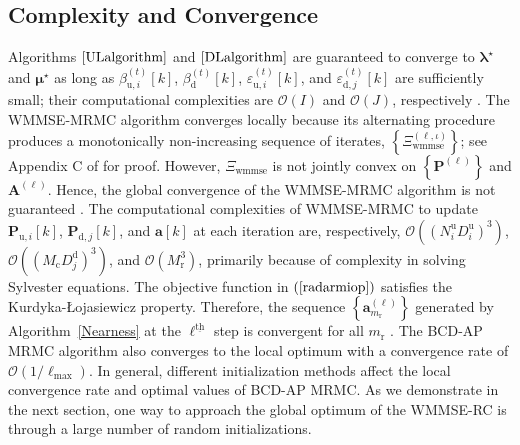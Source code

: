 \documentclass[10pt,journal]{IEEEtran}
\newcommand{\paren}[1]{\left({#1}\right)}
\newcommand{\bracket}[1]{{\left [{#1}\right ]}}
\newcommand{\braces}[1]{{\left\{ {#1}\right\}}}
\newcommand{\ith}[1]    {{#1}^{\underline{\text{th}}}}
\newcommand{\rr}{_\mathrm{r}}
\newcommand{\PiB}{\mathbf{P}_{\textrm{u},i}\bracket{k}}
\newcommand{\PBj}{\mathbf{P}_{\textrm{d},j}\bracket{k}}
\newcommand{\sfrac}[2]{#1/#2}
\theoremstyle{definition}
\begin{document}
		\subsection{Complexity and Convergence}
		Algorithms $\ref{ULalgorithm}$ and $\ref{DLalgorithm}$ are guaranteed to converge to $\boldsymbol{\lambda}^\star$ and $\boldsymbol{\mu}^\star$ as long as $\beta^{\paren{t}}_{\textrm{u},i}\bracket{k}$, $\beta^{\paren{t}}_{\textrm{d}}\bracket{k}$, $\varepsilon^{\paren{t}}_{\textrm{u},i}\bracket{k}$, and $\varepsilon^{\paren{t}}_{\textrm{d},j}\bracket{k}$ are sufficiently small; their computational complexities are $\mathcal{O}\paren{\mathit{I}}$ and $\mathcal{O}\paren{\mathit{J}}$, respectively \cite{Lui2006subg}. The WMMSE-MRMC algorithm converges locally because its alternating procedure produces a monotonically non-increasing sequence of iterates, $\braces{\Xi^{\paren{\ell,\iota}}_{\textrm{wmmse}}}$; see Appendix C of \cite{Luo2011IterativeWMMSE} for proof. However, $\Xi_{\textrm{wmmse}}$ is not jointly convex on $\braces{\mathbf{P}^{\paren{\ell}}}$ and $\mathbf{A}^{\paren{\ell}}$. Hence, the global convergence of the WMMSE-MRMC algorithm is not guaranteed \cite{Luo2011IterativeWMMSE,FD_WMMSE}. The computational complexities of WMMSE-MRMC to update $\PiB$, $\PBj$, and $\mathbf{a}\bracket{k}$ at each iteration are, respectively, $\mathcal{O}\paren{\paren{N^\textrm{u}_iD^\textrm{u}_{i}}^3}$, $\mathcal{O}\paren{\paren{M_{\textrm{c}}D^\textrm{d}_{j}}^3}$, and $\mathcal{O}\paren{M_{\textrm{r}}^3}$, primarily because of complexity in solving Sylvester equations. The objective function in $\paren{\ref{radarmiop}}$ satisfies the Kurdyka-\L ojasiewicz property. Therefore, the sequence $\braces{\mathbf{a}^{\paren{\ell}}_{m\rr}}$ generated by Algorithm~\ref{Nearness} at the $\ith{\ell}$ step is convergent for all $m\rr$ \cite{arXiv180203889Z}. The BCD-AP MRMC algorithm also converges to the local optimum with a convergence rate of $\mathcal{O}\paren{\sfrac{1}{\mathrm{\ell}_{\textrm{max}}}}$\cite{BCDconvergence}. 
		In general, different initialization methods affect the local convergence rate and optimal values of BCD-AP MRMC. As we demonstrate in the next section, one way to approach the global optimum of the WMMSE-RC is through a large number of random initializations\cite{Luo2011IterativeWMMSE}.
\end{document}
